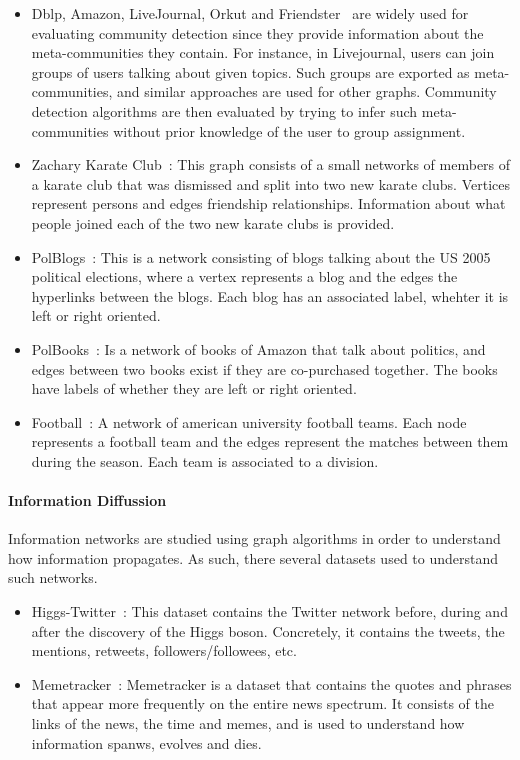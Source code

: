 \begin{itemize}
  \item Dblp, Amazon, LiveJournal, Orkut and Friendster~\cite{yang2015defining}
    are widely used for evaluating community detection since they provide
    information about the meta-communities they contain. For instance, in
    Livejournal, users can join groups of users talking about given topics. Such
    groups are exported as meta-communities, and similar approaches are used for
    other graphs. Community detection algorithms are then evaluated by trying to
    infer such meta-communities without prior knowledge of the user to group
    assignment.
  \item Zachary Karate Club~\cite{zachary1977information}: This graph consists
    of a small networks of members of a karate club that was dismissed and split
    into two new karate clubs. Vertices represent persons and edges friendship
    relationships. Information about what people joined each of the two new
    karate clubs is provided.
  \item PolBlogs~\cite{adamic2005political}: This is a network consisting of
    blogs talking about the US 2005 political elections, where a vertex
    represents a blog and the edges the hyperlinks between the blogs. Each blog
    has an associated label, whehter it is left or right oriented.
  \item PolBooks~\cite{10dimacs}: Is a network of books of Amazon that talk
    about politics, and edges between two books exist if they are co-purchased
    together. The books have labels of whether they are left or right oriented.
  \item Football~\cite{girvan2002network}: A network of american university
    football teams. Each node represents a football team and the edges represent
    the matches between them during the season. Each team is associated to a
    division.
\end{itemize}

\paragraph{Information Diffussion}

Information networks are studied using graph algorithms in order to understand
how information propagates. As such, there several datasets used to understand
such networks.

\begin{itemize}
  \item Higgs-Twitter~\cite{de2013anatomy}: This dataset contains the Twitter
    network before, during and after the discovery of the Higgs boson.
    Concretely, it contains the tweets, the mentions, retweets,
    followers/followees, etc.  
  \item Memetracker~\cite{leskovec2009meme}: Memetracker is a dataset that
    contains the quotes and phrases that appear more frequently on the entire
    news spectrum. It consists of the links of the news, the time and memes, and
    is used to understand how information spanws, evolves and dies.
\end{itemize}

